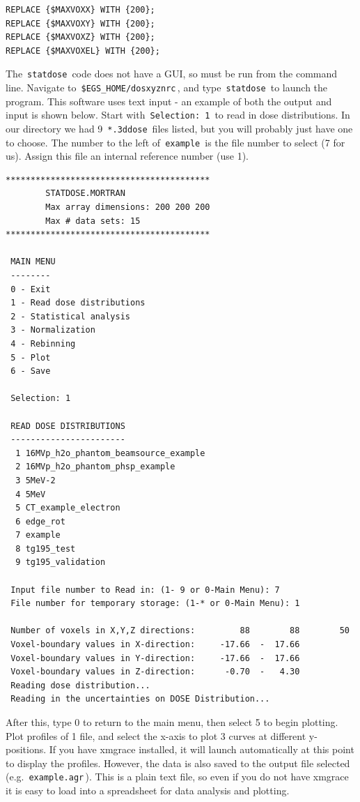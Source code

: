 \documentclass[12pt,twoside]{article}
\begin{document}
{\scriptsize
\begin{lstlisting}[language={},backgroundcolor=\color{white}]
REPLACE {$MAXVOXX} WITH {200};
REPLACE {$MAXVOXY} WITH {200};
REPLACE {$MAXVOXZ} WITH {200};
REPLACE {$MAXVOXEL} WITH {200};
\end{lstlisting}
}

The \,\Verb|statdose|\, code does not have a GUI, so must be run from the command line. Navigate to \,\Verb|$EGS_HOME/dosxyznrc|\,, and type \,\Verb|statdose|\, to launch the program. This software uses text input - an example of both the output and input is shown below. Start with \,\Verb|Selection: 1|\, to read in dose distributions. In our directory we had 9 \,\Verb|*.3ddose|\, files listed, but you will probably just have one to choose. The number to the left of \,\Verb|example|\, is the file number to select (7 for us). Assign this file an internal reference number (use 1).

{\scriptsize
\begin{lstlisting}[language={},backgroundcolor=\color{white}]
*****************************************
        STATDOSE.MORTRAN
        Max array dimensions: 200 200 200
        Max # data sets: 15
*****************************************

 MAIN MENU
 --------
 0 - Exit
 1 - Read dose distributions
 2 - Statistical analysis
 3 - Normalization
 4 - Rebinning
 5 - Plot
 6 - Save

 Selection: 1

 READ DOSE DISTRIBUTIONS
 -----------------------
  1 16MVp_h2o_phantom_beamsource_example
  2 16MVp_h2o_phantom_phsp_example
  3 5MeV-2
  4 5MeV
  5 CT_example_electron
  6 edge_rot
  7 example
  8 tg195_test
  9 tg195_validation

 Input file number to Read in: (1- 9 or 0-Main Menu): 7
 File number for temporary storage: (1-* or 0-Main Menu): 1

 Number of voxels in X,Y,Z directions:         88        88        50
 Voxel-boundary values in X-direction:     -17.66  -  17.66
 Voxel-boundary values in Y-direction:     -17.66  -  17.66
 Voxel-boundary values in Z-direction:      -0.70  -   4.30
 Reading dose distribution...
 Reading in the uncertainties on DOSE Distribution...
\end{lstlisting}
}

After this, type 0 to return to the main menu, then select 5 to begin plotting. Plot profiles of 1 file, and select the x-axis to plot 3 curves at different y-positions. If you have xmgrace installed, it will launch automatically at this point to display the profiles. However, the data is also saved to the output file selected (e.g. \,\Verb|example.agr|\,). This is a plain text file, so even if you do not have xmgrace it is easy to load into a spreadsheet for data analysis and plotting.
\end{document}
